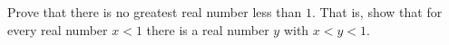 Prove that there is no greatest real number less than $1$. That is, show that for every real number $x<1$ there is a real number $y$ with $x<y<1$.
